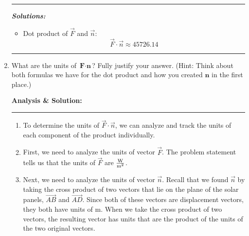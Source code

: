 \documentclass[12pt]{article} %
\numberwithin{equation}{section}
\begin{document}
\begin{enumerate}[label=\roman*.]
\begin{enumerate}[label=\arabic*.]
\[                    \]
            \end{enumerate}
\pagebreak[3]
            \begin{center}
            \rule{\linewidth}{0.1pt}
            \end{center}
            \hspace{0.5em}
            \textbf{\textit{Solutions:}}
            \begin{itemize}
                \item Dot product of \(\vec{F}\) and \(\vec{n}\):
                    \[
                    \boxed{\vec{F} \cdotp \vec{n} \approx 45726.14}
                    \]
            \end{itemize}
            \begin{center}
            \rule{\linewidth}{1pt}
            \end{center}
\pagebreak[3]
    \item What are the units of \(\textbf{F} \cdot \textbf{n}\)?
            Fully justify your answer.
            (Hint: Think about both formulas we have for the dot product and how you created \(\textbf{n}\) in the first place.)\par
            \bigskip
            \hspace{0.5em}
            \textbf{Analysis \& Solution:}
            \begin{center}
            \rule{\linewidth}{1pt}
            \end{center}
            \begin{enumerate}[label=\arabic*.]
                \item To determine the units of \(\vec{F} \cdotp \vec{n}\), we can analyze and track the units of each component of the product individually.
                \item First, we need to analyze the units of vector \(\vec{F}\).
                    The problem statement tells us that the units of \(\vec{F}\) are \(\si{\frac{\watt}{\meter^2}}\).
                \item Next, we need to analyze the units of vector \(\vec{n}\).
                    Recall that we found \(\vec{n}\) by taking the cross product of two vectors that lie on the plane of the solar panels, \(\overrightarrow{AB}\) and \(\overrightarrow{AD}\).
                    Since both of these vectors are displacement vectors, they both have units of \(\si{\meter}\).
                    When we take the cross product of two vectors, the resulting vector has units that are the product of the units of the two original vectors.

\end{enumerate}
\end{enumerate}
\end{document}
